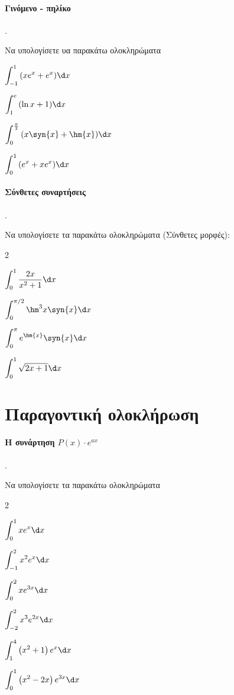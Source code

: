 \documentclass[11pt,a4paper,twocolumn]{article}
\newcounter{askhsh}
\newcommand{\askhsh}{\large\theaskhsh.\ \addtocounter{askhsh}{1}}
\begin{document}
\paragraph{Γινόμενο - πηλίκο}
\askhsh Να υπολογίσετε υα παρακάτω ολοκληρώματα
\begin{alist}
\item $\displaystyle\int_{-1}^{1}{(xe^x+e^x)\d x}$
\item $\displaystyle\int_{1}^{e}{(\ln{x}+1)\d x}$
\item $\displaystyle\int_{0}^{\frac{\pi}{2}}{(x\syn{x}+\hm{x})\d x}$
\item $\displaystyle\int_{0}^{1}{(e^x+xe^x)\d x}$ %
\end{alist}
\paragraph{Σύνθετες συναρτήσεις}
\askhsh Να υπολογίσετε τα παρακάτω ολοκληρώματα (Σύνθετες μορφές):
\begin{multicols}{2}
\begin{alist}
\item $\displaystyle\int_{0}^{1} \dfrac{2x}{x^2+1} \d x$
\item $\displaystyle\int_{0}^{\pi/2} \hm^3{x} \syn{x} \d x$
\item $\displaystyle\int_{0}^{\pi} e^{\hm{x}} \syn{x} \d x$
\item $\displaystyle\int_{0}^{1} \sqrt{2x+1} \d x$
\end{alist}
\end{multicols}
\section{Παραγοντική ολοκλήρωση}
\paragraph{Η συνάρτηση $P(x)\cdot e^{ax}$}
\askhsh Να υπολογίσετε τα παρακάτω ολοκληρώματα
\begin{multicols}{2}
\begin{alist}
\item $\displaystyle\int_{0}^{1}{xe^x\d x}$
\item $\displaystyle\int_{-1}^{2}{x^2e^x\d x} $
\item $\displaystyle\int_{0}^{2}{xe^{3x}\d x}$
\item $\displaystyle\int_{-2}^{2}{x^3e^{2x}\d x}$
\item $\displaystyle\int_{1}^{4}{\left(x^2+1\right)e^x \d x}$
\item $\displaystyle\int_{0}^{1}{\left(x^2-2x\right)e^{3x}\d x}$
\end{alist}
\end{multicols}
\end{document}
